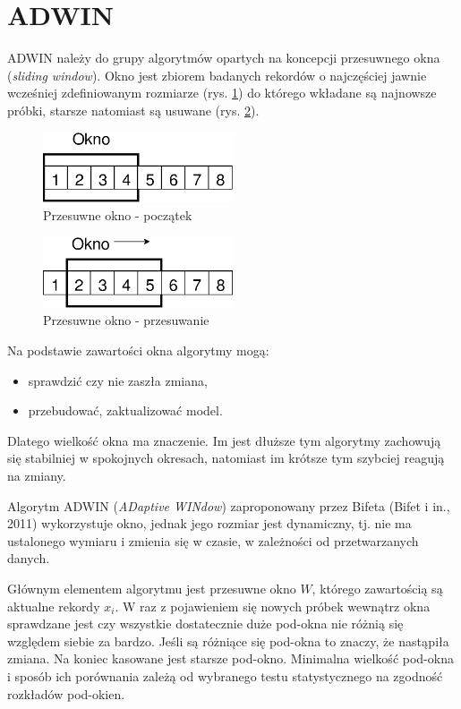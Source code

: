 \section{ADWIN}
\label{sec:ADWIN}
ADWIN należy do grupy algorytmów opartych na koncepcji przesuwnego okna (\textit{sliding window}).
Okno jest zbiorem badanych rekordów o najczęściej jawnie wcześniej zdefiniowanym rozmiarze (rys. \ref{fig:SlidingWindowInit})
do którego wkładane są najnowsze próbki, starsze natomiast są usuwane (rys. \ref{fig:SlidingWindowMove}).
\begin{figure}[htbp]
\centering
	\includegraphics[width=0.5\textwidth]{img/slidingWindowInit}
	\caption{Przesuwne okno - początek}
  \label{fig:SlidingWindowInit}
\end{figure}
\begin{figure}[htbp]
\centering
	\includegraphics[width=0.5\textwidth]{img/slidingWindowMove}
	\caption{Przesuwne okno - przesuwanie}
  \label{fig:SlidingWindowMove}
\end{figure}
Na podstawie zawartości okna algorytmy mogą:
\begin{itemize}
  \item sprawdzić czy nie zaszła zmiana,
  \item przebudować, zaktualizować model.
\end{itemize}
Dlatego wielkość okna ma znaczenie.
Im jest dłuższe tym algorytmy zachowują się stabilniej w spokojnych okresach,
natomiast im krótsze tym szybciej reagują na zmiany.

Algorytm ADWIN (\textit{ADaptive WINdow}) zaproponowany przez Bifeta (Bifet i in., 2011)
wykorzystuje okno, jednak jego rozmiar jest dynamiczny,
tj. nie ma ustalonego wymiaru i zmienia się w czasie, w zależności od przetwarzanych danych.

Głównym elementem algorytmu jest przesuwne okno $W$,
którego zawartością są aktualne rekordy $x_{i}$.
W raz z pojawieniem się nowych próbek wewnątrz okna
sprawdzane jest czy wszystkie dostatecznie duże pod-okna nie różnią się względem siebie za bardzo.
Jeśli są różniące się pod-okna to znaczy,
że nastąpiła zmiana. Na koniec kasowane jest starsze pod-okno.
Minimalna wielkość pod-okna i sposób ich porównania zależą od wybranego testu statystycznego
na zgodność rozkładów pod-okien.
